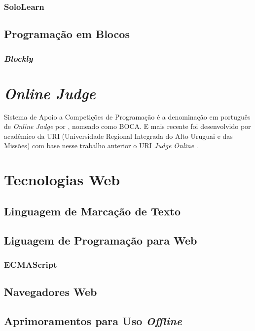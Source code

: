 \subsubsection{SoloLearn}

\subsection{Programação em Blocos}

\subsubsection{\textit{Blockly}}

\section{\textit{Online Judge}}

Sistema de Apoio a Competições de Programação é a denominação em português de
\textit{Online Judge} por , nomeado como BOCA.
E mais recente foi desenvolvido por acadêmico da URI (Universidade Regional
Integrada do Alto Uruguai e das Missões) com base nesse trabalho anterior o URI
\textit{Judge Online} \cite{tonin2013uri}.

\section{Tecnologias Web}

\subsection{Linguagem de Marcação de Texto}

\subsection{Liguagem de Programação para Web}

\subsubsection{ECMAScript}

\subsection{Navegadores Web}

\subsection{Aprimoramentos para Uso \textit{Offline}}


